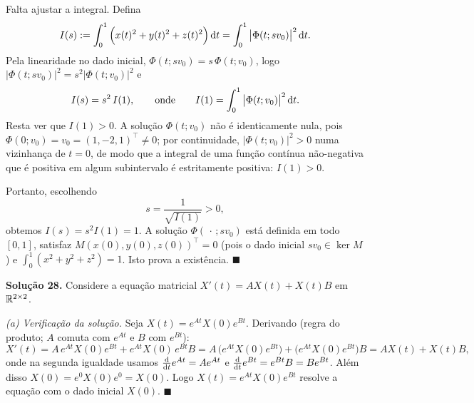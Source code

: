 Falta ajustar a integral. Defina
\[
    I(s):=\int_0^1\Big(x(t)^2+y(t)^2+z(t)^2\Big)\,\mathrm{d} t=\int_0^1\big|\Phi(t;s v_0)\big|^2\,\mathrm{d} t .
\]
Pela linearidade no dado inicial, $\Phi(t;s v_0)=s\,\Phi(t;v_0)$, logo $\big|\Phi(t;s v_0)\big|^2=s^2\big|\Phi(t;v_0)\big|^2$ e
\[
    I(s)=s^2\,I(1),\qquad\text{onde}\qquad I(1)=\int_0^1\big|\Phi(t;v_0)\big|^2\,\mathrm{d} t .
\]
Resta ver que $I(1)>0$. A solução $\Phi(t;v_0)$ não é identicamente nula, pois $\Phi(0;v_0)=v_0=(1,-2,1)^{\!\top}\neq0$; por continuidade, $\big|\Phi(t;v_0)\big|^2>0$ numa vizinhança de $t=0$, de modo que a integral de uma função contínua não-negativa que é positiva em algum subintervalo é estritamente positiva: $I(1)>0$.

Portanto, escolhendo
\[
    s=\frac{1}{\sqrt{I(1)}}>0,
\]
obtemos $I(s)=s^2 I(1)=1$. A solução $\Phi(\,\cdot\,;s v_0)$ está definida em todo $[0,1]$, satisfaz $M(x(0),y(0),z(0))^{\!\top}=0$ (pois o dado inicial $s v_0\in\ker M$) e $\int_0^1(x^2+y^2+z^2)=1$. Isto prova a existência. \qquad$\blacksquare$


\bigskip\noindent\textbf{Solução 28.}\quad
Considere a equação matricial $X'(t)=AX(t)+X(t)B$ em $\mathbb{R}^{2\times2}$.

\emph{(a) Verificação da solução.}
Seja $X(t)=e^{At}X(0)e^{Bt}$. Derivando (regra do produto; $A$ comuta com $e^{At}$ e $B$ com $e^{Bt}$):
\[
    X'(t)=A\,e^{At}X(0)e^{Bt}+e^{At}X(0)\,e^{Bt}B
         =A\,\big(e^{At}X(0)e^{Bt}\big)+\big(e^{At}X(0)e^{Bt}\big)B
         =AX(t)+X(t)B,
\]
onde na segunda igualdade usamos $\frac{\mathrm{d}}{\mathrm{d} t}e^{At}=Ae^{At}$ e $\frac{\mathrm{d}}{\mathrm{d} t}e^{Bt}=e^{Bt}B=Be^{Bt}$. Além disso $X(0)=e^{0}X(0)e^{0}=X(0)$. Logo $X(t)=e^{At}X(0)e^{Bt}$ resolve a equação com o dado inicial $X(0)$. \qquad$\blacksquare$

